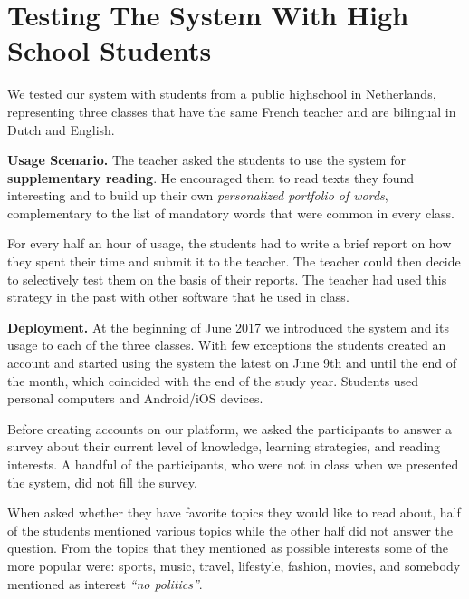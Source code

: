 
\section{Testing The System With High School Students}
\label{sec:demographics}

We tested our system with \stcnt students from a public highschool in Netherlands, representing three classes that have the same French teacher and are bilingual in Dutch and English. 

{\bf Usage Scenario. }
	The teacher asked the students to use the system for {\bf supplementary reading}. 
	He encouraged them to read texts they found interesting and to build up their own {\em personalized portfolio of words}, complementary to the list of mandatory words that were common in every class.
	
	For every half an hour of usage, the students had to write a brief report on how they spent their time and submit it to the teacher. The teacher could then decide to selectively test them on the basis of their reports. 
	The teacher had used this strategy in the past with other software that he used in class. 


{\bf Deployment.} At the beginning of June 2017 we introduced the system and its usage to each of the three classes. With few exceptions the students created an account and started using the system the latest on June 9th and until the end of the month, which coincided with the end of the study year. 
Students used personal computers and Android/iOS devices.

Before creating accounts on our platform, we asked the participants to answer a survey about their current level of knowledge, learning strategies, and reading interests. A handful of the participants, who were not in class when we presented the system, did not fill the survey.

When asked whether they have favorite topics they would like to read about, half of the students mentioned various topics while the other half did not answer the question. From the topics that they mentioned as possible interests some of the more popular were: sports, music, travel, lifestyle, fashion, movies, and somebody mentioned as interest {\em ``no politics''}.


